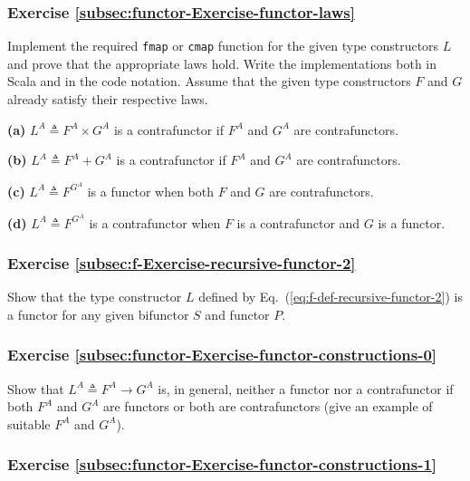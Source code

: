 \subsubsection{Exercise \label{subsec:functor-Exercise-functor-laws}\ref{subsec:functor-Exercise-functor-laws}}

Implement the required \lstinline!fmap! or \lstinline!cmap! function
for the given type constructors $L$ and prove that the appropriate
laws hold. Write the implementations both in Scala and in the code
notation. Assume that the given type constructors $F$ and $G$ already
satisfy their respective laws.

\textbf{(a)} $L^{A}\triangleq F^{A}\times G^{A}$ is a contrafunctor
if $F^{A}$ and $G^{A}$ are contrafunctors.

\textbf{(b)} $L^{A}\triangleq F^{A}+G^{A}$ is a contrafunctor if
$F^{A}$ and $G^{A}$ are contrafunctors.

\textbf{(c)} $L^{A}\triangleq F^{G^{A}}$ is a functor when both $F$
and $G$ are contrafunctors.

\textbf{(d)} $L^{A}\triangleq F^{G^{A}}$ is a contrafunctor when
$F$ is a contrafunctor and $G$ is a functor.

\subsubsection{Exercise \label{subsec:f-Exercise-recursive-functor-2}\ref{subsec:f-Exercise-recursive-functor-2}}

Show that the type constructor $L$ defined by Eq.~(\ref{eq:f-def-recursive-functor-2})
is a functor for any given bifunctor $S$ and functor $P$. 

\subsubsection{Exercise \label{subsec:functor-Exercise-functor-constructions-0}\ref{subsec:functor-Exercise-functor-constructions-0}}

Show that $L^{A}\triangleq F^{A}\rightarrow G^{A}$ is, in general,
neither a functor nor a contrafunctor if both $F^{A}$ and $G^{A}$
are functors or both are contrafunctors (give an example of suitable
$F^{A}$ and $G^{A}$).

\subsubsection{Exercise \label{subsec:functor-Exercise-functor-constructions-1}\ref{subsec:functor-Exercise-functor-constructions-1}}

